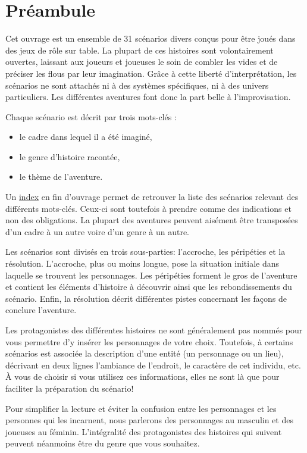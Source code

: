 \documentclass[a5paper,pagesize,10pt,bibliography=totoc,numbers=enddot,
headings=normal,DIV=9,twoside=false,tablecaptionabove]{scrbook}
\begin{document}
\chapter*{Préambule}

Cet ouvrage est un ensemble de 31 scénarios divers conçus pour être joués dans des jeux de rôle sur table.
La plupart de ces histoires sont volontairement ouvertes, laissant aux joueurs et joueuses le soin de combler les vides et de préciser les flous par leur imagination.
Grâce à cette liberté d'interprétation, les scénarios ne sont attachés ni à des systèmes spécifiques, ni à des univers particuliers.
Les différentes aventures font donc la part belle à l'improvisation.

Chaque scénario est décrit par trois mots-clés :
\begin{itemize}
	\item le cadre dans lequel il a été imaginé,
	\item le genre d'histoire racontée,
	\item le thème de l'aventure.
\end{itemize}

Un \hyperref[index]{index} en fin d'ouvrage permet de retrouver la liste des scénarios relevant des différents mots-clés.
Ceux-ci sont toutefois à prendre comme des indications et non des obligations.
La plupart des aventures peuvent aisément être transposées d'un cadre à un autre voire d'un genre à un autre.

Les scénarios sont divisés en trois sous-parties: l'accroche, les péripéties et la résolution.
L'accroche, plus ou moins longue, pose la situation initiale dans laquelle se trouvent les personnages.
Les péripéties forment le gros de l'aventure et contient les éléments d'histoire à découvrir ainsi que les rebondissements du scénario.
Enfin, la résolution décrit différentes pistes concernant les façons de conclure l'aventure.

Les protagonistes des différentes histoires ne sont généralement pas nommés pour vous permettre d'y insérer les personnages de votre choix.
Toutefois, à certains scénarios est associée la description d'une entité (un personnage ou un lieu), décrivant en deux lignes l'ambiance de l'endroit, le caractère de cet individu, etc.
À vous de choisir si vous utilisez ces informations, elles ne sont là que pour faciliter la préparation du scénario!

Pour simplifier la lecture et éviter la confusion entre les personnages et les personnes qui les incarnent, nous parlerons des personnages au masculin et des joueuses au féminin.
L'intégralité des protagonistes des histoires qui suivent peuvent néanmoins être du genre que vous souhaitez.
\end{document}
